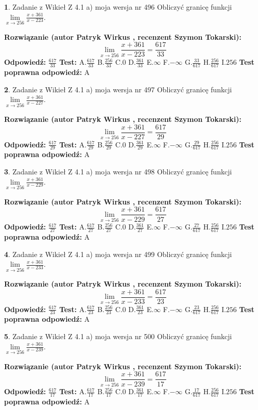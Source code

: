 \documentclass[12pt, a4paper]{article}
\theoremstyle{definition} %
\newtheorem{zad}{}
\newcommand{\zadStart}[1]{\begin{zad}#1\newline}
\newcommand{\zadStop}{\end{zad}}
\newcommand{\rozwStart}[2]{\noindent \textbf{Rozwiązanie (autor #1 , recenzent #2): }\newline}
\newcommand{\rozwStop}{\newline}
\newcommand{\odpStart}{\noindent \textbf{Odpowiedź:}\newline}
\newcommand{\odpStop}{\newline}
\newcommand{\testStart}{\noindent \textbf{Test:}\newline}
\newcommand{\testStop}{\newline}
\newcommand{\kluczStart}{\noindent \textbf{Test poprawna odpowiedź:}\newline}
\newcommand{\kluczStop}{\newline}
\begin{document}
\zadStart{Zadanie z Wikieł Z 4.1 a) moja wersja nr 496}
Obliczyć granicę funkcji $\lim\limits_{x\to256}\frac{x+361}{x-223}$.
\zadStop
\rozwStart{Patryk Wirkus}{Szymon Tokarski}
$$\lim\limits_{x\to256}\frac{x+361}{x-223} = \frac{617}{33}$$
\rozwStop
\odpStart
$\frac{617}{33}$
\odpStop
\testStart
A.$\frac{617}{33}$
B.$\frac{256}{33}$
C.$0$
D.$\frac{361}{33}$
E.$\infty$
F.$-\infty$
G.$\frac{33}{617}$
H.$\frac{256}{617}$
I.$256$
\testStop
\kluczStart
A
\kluczStop



\zadStart{Zadanie z Wikieł Z 4.1 a) moja wersja nr 497}
Obliczyć granicę funkcji $\lim\limits_{x\to256}\frac{x+361}{x-227}$.
\zadStop
\rozwStart{Patryk Wirkus}{Szymon Tokarski}
$$\lim\limits_{x\to256}\frac{x+361}{x-227} = \frac{617}{29}$$
\rozwStop
\odpStart
$\frac{617}{29}$
\odpStop
\testStart
A.$\frac{617}{29}$
B.$\frac{256}{29}$
C.$0$
D.$\frac{361}{29}$
E.$\infty$
F.$-\infty$
G.$\frac{29}{617}$
H.$\frac{256}{617}$
I.$256$
\testStop
\kluczStart
A
\kluczStop



\zadStart{Zadanie z Wikieł Z 4.1 a) moja wersja nr 498}
Obliczyć granicę funkcji $\lim\limits_{x\to256}\frac{x+361}{x-229}$.
\zadStop
\rozwStart{Patryk Wirkus}{Szymon Tokarski}
$$\lim\limits_{x\to256}\frac{x+361}{x-229} = \frac{617}{27}$$
\rozwStop
\odpStart
$\frac{617}{27}$
\odpStop
\testStart
A.$\frac{617}{27}$
B.$\frac{256}{27}$
C.$0$
D.$\frac{361}{27}$
E.$\infty$
F.$-\infty$
G.$\frac{27}{617}$
H.$\frac{256}{617}$
I.$256$
\testStop
\kluczStart
A
\kluczStop



\zadStart{Zadanie z Wikieł Z 4.1 a) moja wersja nr 499}
Obliczyć granicę funkcji $\lim\limits_{x\to256}\frac{x+361}{x-233}$.
\zadStop
\rozwStart{Patryk Wirkus}{Szymon Tokarski}
$$\lim\limits_{x\to256}\frac{x+361}{x-233} = \frac{617}{23}$$
\rozwStop
\odpStart
$\frac{617}{23}$
\odpStop
\testStart
A.$\frac{617}{23}$
B.$\frac{256}{23}$
C.$0$
D.$\frac{361}{23}$
E.$\infty$
F.$-\infty$
G.$\frac{23}{617}$
H.$\frac{256}{617}$
I.$256$
\testStop
\kluczStart
A
\kluczStop



\zadStart{Zadanie z Wikieł Z 4.1 a) moja wersja nr 500}
Obliczyć granicę funkcji $\lim\limits_{x\to256}\frac{x+361}{x-239}$.
\zadStop
\rozwStart{Patryk Wirkus}{Szymon Tokarski}
$$\lim\limits_{x\to256}\frac{x+361}{x-239} = \frac{617}{17}$$
\rozwStop
\odpStart
$\frac{617}{17}$
\odpStop
\testStart
A.$\frac{617}{17}$
B.$\frac{256}{17}$
C.$0$
D.$\frac{361}{17}$
E.$\infty$
F.$-\infty$
G.$\frac{17}{617}$
H.$\frac{256}{617}$
I.$256$
\testStop
\kluczStart
A
\kluczStop
\end{document}
